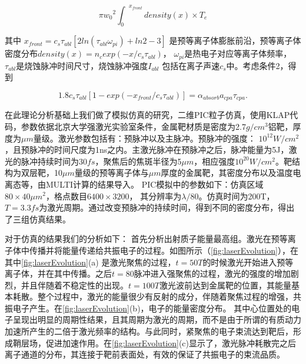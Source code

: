 \begin{equation}
\label{eqn:energyOsilationElectron}
 \pi {w_0}^2 {{\int}_{0}}^{x_{front}} density(x) \times T_e
\end{equation}

其中 $x_{front}=c_s {\tau}_{abl}[2ln({\tau}_{abl} {\omega}_{pi})+ln2-3]$\cite{mora2003plasma}    是预等离子体膨胀前沿，预等离子体密度分布$density(x)=n_c exp(-x/{c_s{\tau}_{abl}})$， ${\omega}_{pi}$是热电子对应等离子体频率， ${\tau}_{abl}$是烧蚀脉冲时间尺寸，烧蚀脉冲强度$I_{abl}$ 包括在离子声速$c_s$中。考虑条件2，得到



\begin{equation}
\label{eqn:OptimalCondition}
{1.8} c_s {\tau}_{abl}[1-exp(-x_{front}/{c_s{\tau}_{abl}})] 
 = {\alpha}_{absorb} a_{cpa} \tau_{cpa}.
\end{equation}







在此理论分析基础上我们做了模拟仿真的研究，二维PIC粒子仿真，使用KLAP代码，参数依据北京大学强激光实验室条件，金属靶材质是密度为2.7$g/cm^3$铝靶，厚度为$\mu m$量级。激光参数包括有：预脉冲以及主脉冲。预脉冲的强度： $10^12W/cm^2$，且预脉冲的时间尺度为1ns之内。主激光脉冲在预脉冲之后，脉冲能量为5J，激光的脉冲持续时间为$30fs$，聚焦后的焦斑半径为5$\mu m$，相应强度$10^20W/cm^2$。靶结构为双层靶，10$\mu  m$量级的预等离子体与$\mu m$厚度的金属靶，其密度分布以及温度电离态等，由MULTI计算的结果导入。 PIC模拟中的参数如下：仿真区域$80 \times 40 \mu m^2$，格点数目$6400 \times 3200$， 其分辨率为$\lambda / 80$。仿真时间为200T， $T=3.3fs$为激光周期。通过改变预脉冲的持续时间，得到不同的密度分布，得出了三组仿真结果。

对于仿真的结果我们的分析如下：
首先分析出射质子能量最高组。激光在预等离子体中传播并将能量传递给共振电子的过程。如图所示（\ref{fig:laserEvolution}），在其中\ref{fig:laserEvolution}(a) 是激光聚焦的过程，$t=50T$的时候激光开始进入预等离子体，并在其中传播。之后$t=80$脉冲进入强聚焦的过程，激光的强度的增加剧烈，并且伴随着不稳定性的出现。$t=100T$激光波前达到金属靶的位置，其能量基本耗散。整个过程中，激光的能量很少有反射的成分，伴随着聚焦过程的增强，共振电子产生。在\ref{fig:laserEvolution}(b)，电子的能量密度分布。 其中心位置处的电子呈现出明显的周期性结果，且其周期为激光的周期，而不是由于所谓的有质动力加速所产生的二倍于激光频率的结构。与此同时，紧聚焦的电子束流达到靶后，形成鞘层场，促进加速作用。在\ref{fig:laserEvolution}(c)显示了，激光脉冲耗散完之后离子通道的分布，其连接于靶前表面处，有效的保证了共振电子的束流品质。






